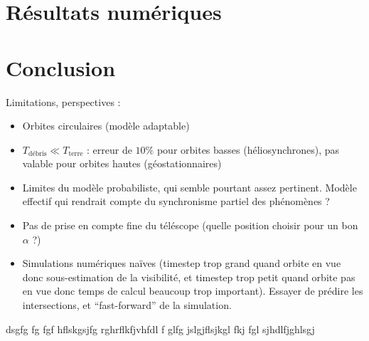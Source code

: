\documentclass[a4paper,11pt]{article}
\numberwithin{section}{part}
\begin{document}
\section{Résultats numériques}

\section{Conclusion}
Limitations, perspectives :
\begin{itemize}
\item Orbites circulaires (modèle adaptable)
\item $T_{\text{débris}} \ll T_{\text{terre}}$ : erreur de $10\%$ pour
  orbites basses (héliosynchrones), pas valable pour orbites hautes
  (géostationnaires)
\item Limites du modèle probabiliste, qui semble pourtant assez
  pertinent. Modèle effectif qui rendrait compte du synchronisme
  partiel des phénomènes ?
\item Pas de prise en compte fine du téléscope (quelle position
  choisir pour un bon $\alpha$ ?)
\item Simulations numériques naïves (timestep trop grand quand orbite
  en vue donc sous-estimation de la visibilité, et timestep trop petit
  quand orbite pas en vue donc temps de calcul beaucoup trop
  important). Essayer de prédire les intersections, et
  ``fast-forward'' de la simulation.
\end{itemize}






\begin{thebibliography}{99}

dsgfg fg fgf hflskgsjfg rghrflkfjvhfdl f glfg jslgjflsjkgl fkj fgl sjhdlfjghlsgj
\end{thebibliography}
\end{document}
